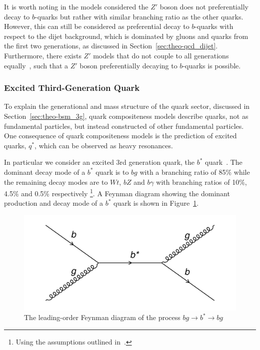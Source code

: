 It is worth noting in the models considered the $Z'$ boson does not preferentially decay to $b$-quarks but rather with similar branching ratio as the other quarks.
However, this can still be considered as preferential decay to $b$-quarks with respect to the dijet background,
which is dominated by gluons and quarks from the first two generations, as discussed in Section~\ref{sec:theo-qcd_dijet}.
Furthermore, there exists $Z'$ models that do not couple to all generations equally~\cite{theo-bsm_zprime_3g},
such that a $Z'$ boson preferentially decaying to $b$-quarks is possible.

\subsubsection{Excited Third-Generation Quark}
\label{sec:theo-bsm_bstar}

To explain the generational and mass structure of the quark sector, discussed in Section~\ref{sec:theo-bsm_3g},
quark compositeness models describe quarks, not as fundamental particles, but instead constructed of other fundamental particles.
One consequence of quark compositeness models is the prediction of excited quarks, $q^{*}$, which can be observed as heavy resonances.

In particular we consider an excited 3rd generation quark, the $b^{*}$ quark~\cite{theo-bsm_bstar}.
The dominant decay mode of a $b^{*}$ quark is to $bg$ with a branching ratio of 85\%
while the remaining decay modes are to $Wt$, $bZ$ and $b\gamma$ with branching ratios of 10\%, 4.5\% and 0.5\% respectively
\footnote{Using the assumptions outlined in~\cite{theo-bsm_bstar}.}.
A Feynman diagram showing the  dominant production and decay mode of a $b^*$ quark is shown in Figure~\ref{fig:theo-bsm_bstar}.

\begin{figure}[!hbt]
  \begin{center}
    \includegraphics[width=0.7\linewidth, angle=0]{figs/Theory/bsm_bstar.png}
  \end{center}
  \caption{The leading-order Feynman diagram of the process $bg \to b^* \to bg$}
  \label{fig:theo-bsm_bstar}
\end{figure}


